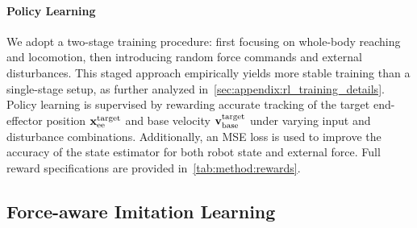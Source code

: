 \documentclass{article}
\begin{document}
\paragraph{Policy Learning} We adopt a two-stage training procedure: first focusing on whole-body reaching and locomotion, then introducing random force commands and external disturbances. This staged approach empirically yields more stable training than a single-stage setup, as further analyzed in~\cref{sec:appendix:rl_training_details}. Policy learning is supervised by rewarding accurate tracking of the target end-effector position ${\mathbf{x}}_{\text{ee}}^{\text{target}}$ and base velocity ${\mathbf{v}}_{\text{base}}^{\text{target}}$ under varying input and disturbance combinations. Additionally, an MSE loss is used to improve the accuracy of the state estimator for both robot state and external force. Full reward specifications are provided in~\cref{tab:method:rewards}.



\subsection{Force-aware Imitation Learning}\label{sec:learning:imitation}
\end{document}
